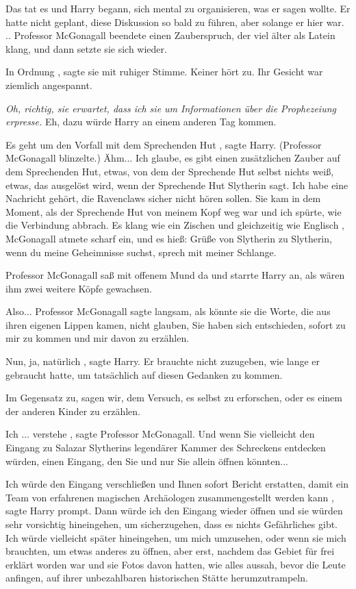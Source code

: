 Das tat es und Harry begann, sich mental zu organisieren, was er sagen wollte.
Er hatte nicht geplant, diese Diskussion so bald zu führen, aber solange er hier
war. .. Professor McGonagall beendete einen Zauberspruch, der viel älter als
Latein klang, und dann setzte sie sich wieder.

\glqq In Ordnung\grqq{} , sagte sie mit ruhiger Stimme. \glqq Keiner hört
zu.\grqq{} Ihr Gesicht war ziemlich angespannt.

\emph{Oh, richtig, sie erwartet, dass ich sie um Informationen über die
Prophezeiung erpresse.} Eh, dazu würde Harry an einem anderen Tag kommen.

\glqq Es geht um den Vorfall mit dem Sprechenden Hut\grqq{} , sagte Harry.
(Professor McGonagall blinzelte.) \glqq Ähm... Ich glaube, es gibt einen
zusätzlichen Zauber auf dem Sprechenden Hut, etwas, von dem der Sprechende Hut
selbst nichts weiß, etwas, das ausgelöst wird, wenn der Sprechende Hut Slytherin
sagt. Ich habe eine Nachricht gehört, die Ravenclaws sicher nicht hören sollen.
Sie kam in dem Moment, als der Sprechende Hut von meinem Kopf weg war und ich
spürte, wie die Verbindung abbrach. Es klang wie ein Zischen und gleichzeitig
wie Englisch\grqq{} , McGonagall atmete scharf ein, \glqq und es hieß: Grüße von
Slytherin zu Slytherin, wenn du meine Geheimnisse suchst, sprech mit meiner
Schlange.\grqq{}

Professor McGonagall saß mit offenem Mund da und starrte Harry an, als wären ihm
zwei weitere Köpfe gewachsen.

\glqq Also...\grqq{} Professor McGonagall sagte langsam, als könnte sie die
Worte, die aus ihren eigenen Lippen kamen, nicht glauben, \glqq Sie haben sich
entschieden, sofort zu mir zu kommen und mir davon zu erzählen.\grqq{}

\glqq Nun, ja, natürlich\grqq{} , sagte Harry. Er brauchte nicht zuzugeben, wie
lange er gebraucht hatte, um tatsächlich auf diesen Gedanken zu kommen.

\glqq Im Gegensatz zu, sagen wir, dem Versuch, es selbst zu erforschen, oder es
einem der anderen Kinder zu erzählen.\grqq{}

\glqq Ich ... verstehe\grqq{} , sagte Professor McGonagall. \glqq Und wenn Sie
vielleicht den Eingang zu Salazar Slytherins legendärer Kammer des Schreckens
entdecken würden, einen Eingang, den Sie und nur Sie allein öffnen
könnten...\grqq{}

\glqq Ich würde den Eingang verschließen und Ihnen sofort Bericht erstatten,
damit ein Team von erfahrenen magischen Archäologen zusammengestellt werden
kann\grqq{} , sagte Harry prompt. \glqq Dann würde ich den Eingang wieder öffnen
und sie würden sehr vorsichtig hineingehen, um sicherzugehen, dass es nichts
Gefährliches gibt. Ich würde vielleicht später hineingehen, um mich umzusehen,
oder wenn sie mich brauchten, um etwas anderes zu öffnen, aber erst, nachdem das
Gebiet für frei erklärt worden war und sie Fotos davon hatten, wie alles aussah,
bevor die Leute anfingen, auf ihrer unbezahlbaren historischen Stätte
herumzutrampeln.\grqq{}

